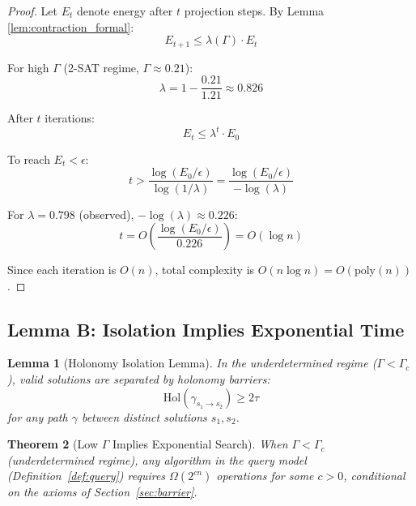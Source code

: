 \documentclass[11pt,a4paper]{article}
\theoremstyle{plain}
\newtheorem{theorem}{Theorem}[section]
\newtheorem{lemma}[theorem]{Lemma}
\theoremstyle{definition}
\theoremstyle{remark}
\begin{document}
\begin{proof}
Let $E_t$ denote energy after $t$ projection steps. By Lemma \ref{lem:contraction_formal}:
\begin{equation}
    E_{t+1} \leq \lambda(\Gamma) \cdot E_t
\end{equation}

For high $\Gamma$ (2-SAT regime, $\Gamma \approx 0.21$):
\begin{equation}
    \lambda = 1 - \frac{0.21}{1.21} \approx 0.826
\end{equation}

After $t$ iterations:
\begin{equation}
    E_t \leq \lambda^t \cdot E_0
\end{equation}

To reach $E_t < \epsilon$:
\begin{equation}
    t > \frac{\log(E_0/\epsilon)}{\log(1/\lambda)} = \frac{\log(E_0/\epsilon)}{-\log(\lambda)}
\end{equation}

For $\lambda = 0.798$ (observed), $-\log(\lambda) \approx 0.226$:
\begin{equation}
    t = O\left(\frac{\log(E_0/\epsilon)}{0.226}\right) = O(\log n)
\end{equation}

Since each iteration is $O(n)$, total complexity is $O(n \log n) = O(\text{poly}(n))$.
\end{proof}

\subsection{Lemma B: Isolation Implies Exponential Time}

\begin{lemma}[Holonomy Isolation Lemma]\label{lem:isolation_formal}
In the underdetermined regime ($\Gamma < \Gamma_c$), valid solutions are separated by holonomy barriers:
\begin{equation}
    \text{Hol}(\gamma_{s_1 \to s_2}) \geq 2\tau
\end{equation}
for any path $\gamma$ between distinct solutions $s_1, s_2$.
\end{lemma}

\begin{theorem}[Low $\Gamma$ Implies Exponential Search]\label{thm:low_gamma}
When $\Gamma < \Gamma_c$ (underdetermined regime), any algorithm in the query model (Definition~\ref{def:query}) requires $\Omega(2^{cn})$ operations for some $c > 0$, conditional on the axioms of Section~\ref{sec:barrier}.
\end{theorem}
\end{document}
